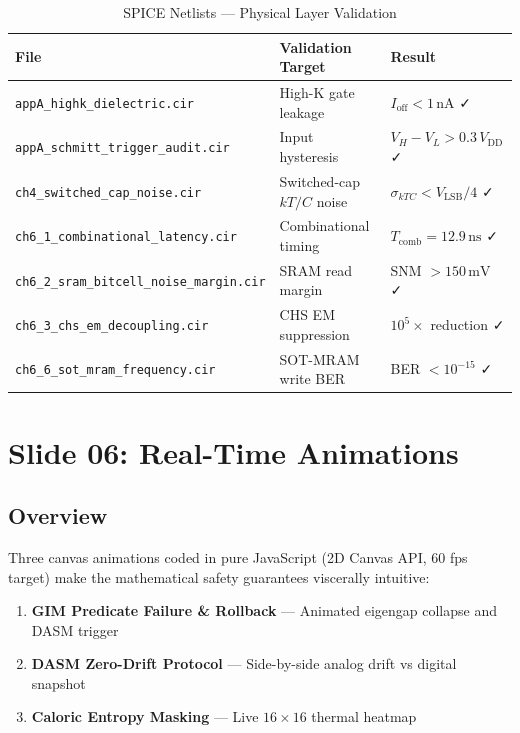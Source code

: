 \documentclass[12pt, a4paper]{article}
\begin{document}
\begin{table}[H]
  \centering
  \caption{SPICE Netlists — Physical Layer Validation}
  \small
  \begin{tabularx}{\textwidth}{l X l}
    \toprule
    \textbf{File} & \textbf{Validation Target} & \textbf{Result} \\
    \midrule
    \texttt{appA\_highk\_dielectric.cir} & High-K gate leakage & $I_{\text{off}} < 1\,\text{nA}$ ✓ \\
    \texttt{appA\_schmitt\_trigger\_audit.cir} & Input hysteresis & $V_H - V_L > 0.3\,V_{\text{DD}}$ ✓ \\
    \texttt{ch4\_switched\_cap\_noise.cir} & Switched-cap $kT/C$ noise & $\sigma_{kTC} < V_{\text{LSB}}/4$ ✓ \\
    \texttt{ch6\_1\_combinational\_latency.cir} & Combinational timing & $T_{\text{comb}} = 12.9\,\text{ns}$ ✓ \\
    \texttt{ch6\_2\_sram\_bitcell\_noise\_margin.cir} & SRAM read margin & SNM $> 150\,\text{mV}$ ✓ \\
    \texttt{ch6\_3\_chs\_em\_decoupling.cir} & CHS EM suppression & $10^5\times$ reduction ✓ \\
    \texttt{ch6\_6\_sot\_mram\_frequency.cir} & SOT-MRAM write BER & BER $< 10^{-15}$ ✓ \\
    \bottomrule
  \end{tabularx}
\end{table}

\section{Slide 06: Real-Time Animations}
\label{sec:anim}

\subsection{Overview}

Three canvas animations coded in pure JavaScript (2D Canvas API, 60 fps target)
make the mathematical safety guarantees viscerally intuitive:

\begin{enumerate}[noitemsep]
  \item \textbf{GIM Predicate Failure \& Rollback} — Animated eigengap collapse and DASM trigger
  \item \textbf{DASM Zero-Drift Protocol} — Side-by-side analog drift vs digital snapshot
  \item \textbf{Caloric Entropy Masking} — Live $16\times16$ thermal heatmap
\end{enumerate}
\end{document}
